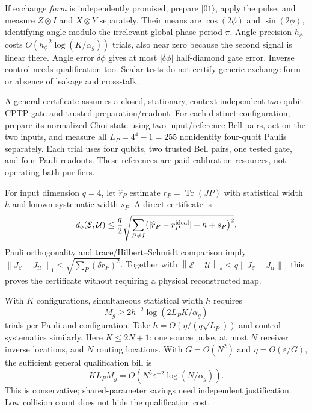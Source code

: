 \documentclass[11pt]{article}
\numberwithin{equation}{section}
\theoremstyle{remark}
\newcommand{\Tr}{\operatorname{Tr}}
\newcommand{\norm}[1]{\left\lVert#1\right\rVert}
\newcommand{\ket}[1]{\lvert#1\rangle}
\newcommand{\eps}{\varepsilon}
\begin{document}
If exchange \emph{form} is independently promised, prepare \(\ket{01}\),
apply the pulse, and measure \(Z\otimes I\) and \(X\otimes Y\) separately.
Their means are \(\cos(2\phi)\) and \(\sin(2\phi)\), identifying angle
modulo the irrelevant global phase period \(\pi\).
Angle precision \(h_\phi\) costs
\(O(h_\phi^{-2}\log(K/\alpha_g))\) trials, also near zero because the
second signal is linear there. Angle error \(\delta\phi\) gives at most
\(|\delta\phi|\) half-diamond gate error. Inverse control needs qualification
too. Scalar tests do not certify generic exchange form or absence of
leakage and cross-talk.

A general certificate assumes a closed, stationary, context-independent
two-qubit CPTP gate and trusted preparation/readout.
For each distinct configuration, prepare its normalized Choi state using
two input/reference Bell pairs, act on the two inputs, and measure all
\(L_P=4^4-1=255\) nonidentity four-qubit Paulis separately.
Each trial uses four qubits, two trusted Bell pairs, one tested gate, and
four Pauli readouts. These references are paid calibration resources,
not operating bath purifiers.

For input dimension \(q=4\), let \(\widehat r_P\) estimate
\(r_P=\Tr(JP)\) with statistical width \(h\) and known systematic width
\(s_P\). A direct certificate is
\begin{equation}
 d_\diamond(\mathcal E,\mathcal U)
 \le\frac q2\sqrt{\sum_{P\ne I}
    \bigl(|\widehat r_P-r_P^{\rm ideal}|+h+s_P\bigr)^2}.
 \label{eq:gate-certificate}
\end{equation}
Pauli orthogonality and trace/Hilbert--Schmidt comparison imply
\(\norm{J_{\mathcal E}-J_{\mathcal U}}_1
\le\sqrt{\sum_P(\delta r_P)^2}\).
Together with
\(\norm{\mathcal E-\mathcal U}_\diamond
\le q\norm{J_{\mathcal E}-J_{\mathcal U}}_1\)
this proves the certificate without requiring a physical reconstructed map.

With \(K\) configurations, simultaneous statistical width \(h\) requires
\begin{equation}
 M_g\ge2h^{-2}\log(2L_PK/\alpha_g)
 \label{eq:gate-shots}
\end{equation}
trials per Pauli and configuration. Take
\(h=O(\eta/(q\sqrt{L_P}))\) and control systematics similarly.
Here \(K\le2N+1\): one source pulse, at most \(N\) receiver inverse locations,
and \(N\) routing locations. With \(G=O(N^2)\) and
\(\eta=\Theta(\eps/G)\), the sufficient general qualification bill is
\begin{equation}
 KL_PM_g=O\!\left(N^5\eps^{-2}\log(N/\alpha_g)\right).
 \label{eq:qualification-cost}
\end{equation}
This is conservative; shared-parameter savings need independent
justification. Low collision count does not hide the qualification cost.
\end{document}
